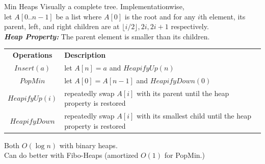 \documentclass[10pt,a4paper]{article}
\begin{document}
\begin{multicols}{3}
    \begin{textbox}{Min Heaps}
         Visually a complete tree. Implementationwise,\\
        let $A[0..n-1]$ be a list where $A[0]$ is the root and for any $i$th element, its parent, left, and right children are at $\lfloor i/2 \rfloor, 2i, 2i+1$ respectively.\\
        \linebreak
        {\bf \emph{Heap Property:}} The parent element is smaller than its children.\\
        \linebreak
        \begin{tabular}{c |p{}}\scriptsize
            {\bf Operations} & {\bf Description}                                                                  \\
            $Insert(a)$      & let $A[n] = a$ and $HeapifyUp(n)$                                                  \\
            $PopMin$         & let $A[0] = A[n-1]$ and $HeapifyDown(0)$                                           \\
            $HeapifyUp(i)$   & repeatedly swap $A[i]$ with its parent until the heap property is restored         \\
            $HeapifyDown$    & repeatedly swap $A[i]$ with its smallest child until the heap property is restored \\
        \end{tabular}
         Both $O(\log n)$ with binary heaps. \\
         Can do better with Fibo-Heaps (amortized $O(1)$ for PopMin.)\\
    \end{textbox}





\end{multicols}
\end{document}
